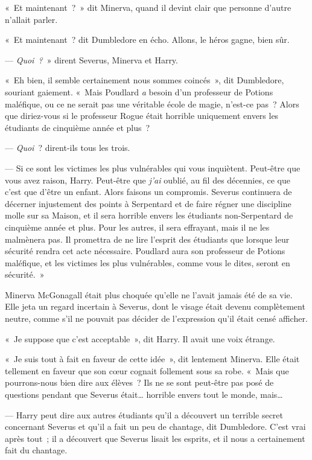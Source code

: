 «~Et maintenant~?~» dit Minerva, quand il devint clair que personne d'autre n'allait parler.

«~Et maintenant~? dit Dumbledore en écho. Allons, le héros gagne, bien sûr.

--- \emph{Quoi~?}~» dirent Severus, Minerva et Harry.

«~Eh bien, il semble certainement nous sommes coincés~», dit Dumbledore, souriant gaiement. «~Mais Poudlard \emph{a} besoin d'un professeur de Potions maléfique, ou ce ne serait pas une véritable école de magie, n'est-ce pas~? Alors que diriez-vous si le professeur Rogue était horrible uniquement envers les étudiants de cinquième année et plus~?

--- \emph{Quoi}~? dirent-ils tous les trois.

--- Si ce sont les victimes les plus vulnérables qui vous inquiètent. Peut-être que vous avez raison, Harry. Peut-être que \emph{j'ai} oublié, au fil des décennies, ce que c'est que d'être un enfant. Alors faisons un compromis. Severus continuera de décerner injustement des points à Serpentard et de faire régner une discipline molle sur sa Maison, et il sera horrible envers les étudiants non-Serpentard de cinquième année et plus. Pour les autres, il sera effrayant, mais il ne les malmènera pas. Il promettra de ne lire l'esprit des étudiants que lorsque leur sécurité rendra cet acte nécessaire. Poudlard aura son professeur de Potions maléfique, et les victimes les plus vulnérables, comme vous le dites, seront en sécurité.~»

Minerva McGonagall était plus choquée qu'elle ne l'avait jamais été de sa vie. Elle jeta un regard incertain à Severus, dont le visage était devenu complètement neutre, comme s'il ne pouvait pas décider de l'expression qu'il était censé afficher.

«~Je suppose que c'est acceptable~», dit Harry. Il avait une voix étrange.

«~Je suis tout à fait en faveur de cette idée~», dit lentement Minerva. Elle était tellement en faveur que son cœur cognait follement sous sa robe. «~Mais que pourrons-nous bien dire aux élèves~? Ils ne se sont peut-être pas posé de questions pendant que Severus était… horrible envers tout le monde, mais…

--- Harry peut dire aux autres étudiants qu'il a découvert un terrible secret concernant Severus et qu'il a fait un peu de chantage, dit Dumbledore. C'est vrai après tout~; il a découvert que Severus lisait les esprits, et il nous a certainement fait du chantage.

